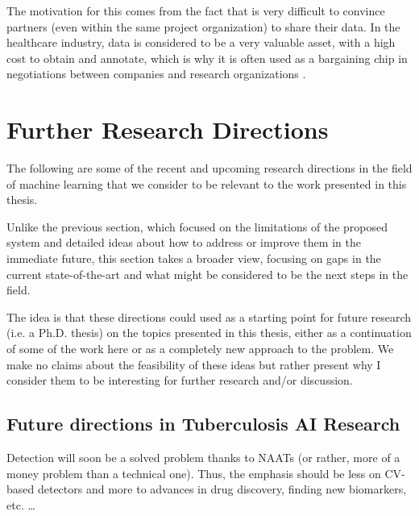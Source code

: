 \documentclass[../main.tex]{subfiles}
\begin{document}
    The motivation for this comes from the fact that is very difficult to convince partners (even within the same project organization) to share their data. In the healthcare industry, data is considered to be a very valuable asset, with a high cost to obtain and annotate, which is why it is often used as a bargaining chip in negotiations between companies and research organizations .


    \clearpage

    \section{Further Research Directions} \label{conclusions:research_directions} 

    The following are some of the recent and upcoming research directions in the field of machine learning that we consider to be relevant to the work presented in this thesis.
    
    Unlike the previous section, which focused on the limitations of the proposed system and detailed ideas about how to address or improve them in the immediate future, this section takes a broader view, focusing on gaps in the current state-of-the-art and what might be considered to be the next steps in the field.
    
    The idea is that these directions could used as a starting point for future research (i.e. a Ph.D. thesis) on the topics presented in this thesis, either as a continuation of some of the work here or as a completely new approach to the problem. We make no claims about the feasibility of these ideas but rather present why I consider them to be interesting for further research and/or discussion.


    \subsection{Future directions in Tuberculosis AI Research} \label{conclusions:future_work:tb_ai} 
    
    Detection will soon be a solved problem thanks to NAATs (or rather, more of a money problem than a technical one). Thus, the emphasis should be less on CV-based detectors and more to advances in drug discovery, finding new biomarkers, etc. \dots

    \clearpage
\end{document}

